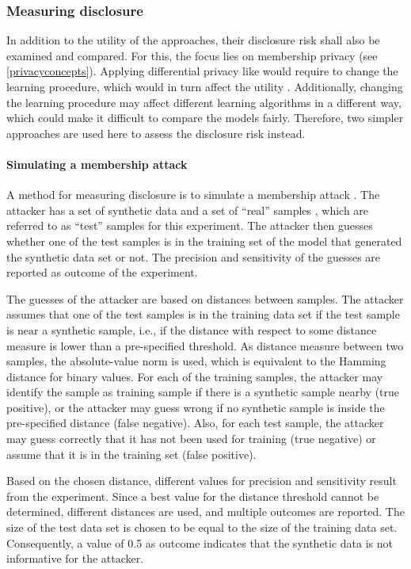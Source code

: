 \documentclass[12pt]{article}
\begin{document}
\subsubsection{Measuring disclosure}\label{measuringdisclosure}

In addition to the utility of the approaches, their disclosure risk shall also be examined and compared.
For this, the focus lies on membership privacy (see \ref{privacyconcepts}).
Applying differential privacy like \cite{abadi_deep_2016} would require to change the learning procedure, which would in turn affect the utility \citep{hayes_logan_2019}.
Additionally, changing the learning procedure may affect different learning algorithms in a different way, which could make it difficult to compare the models fairly.
Therefore, two simpler approaches are used here to assess the disclosure risk instead.

\paragraph{Simulating a membership attack}\label{membershipattack}
A method for measuring disclosure is to simulate a membership attack \citep{choi_generating_2017, goncalves}.
The attacker has a set of synthetic data and a set of ``real'' samples , which are referred to as ``test'' samples for this experiment.
The attacker then guesses whether one of the test samples is in the training set of the model that generated the synthetic data set or not.
The precision and sensitivity of the guesses are reported as outcome of the experiment.

The guesses of the attacker are based on distances between samples.
The attacker assumes that one of the test samples is in the training data set if the test sample is near a synthetic sample, i.e., if the distance with respect to some distance measure is lower than a pre-specified threshold.
As distance measure between two samples, the absolute-value norm is used, which is equivalent to the Hamming distance for binary values.
For each of the training samples, the attacker may identify the sample as training sample if there is a synthetic sample nearby (true positive), or the attacker may guess wrong if no synthetic sample is inside the pre-specified distance (false negative).
Also, for each test sample, the attacker may guess correctly that it has not been used for training (true negative) or assume that it is in the training set (false positive).

Based on the chosen distance, different values for precision and sensitivity result from the experiment.
Since a best value for the distance threshold cannot be determined, different distances are used, and multiple outcomes are reported.
The size of the test data set is chosen to be equal to the size of the training data set.
Consequently, a value of 0.5 as outcome indicates that the synthetic data is not informative for the attacker. 
\end{document}
